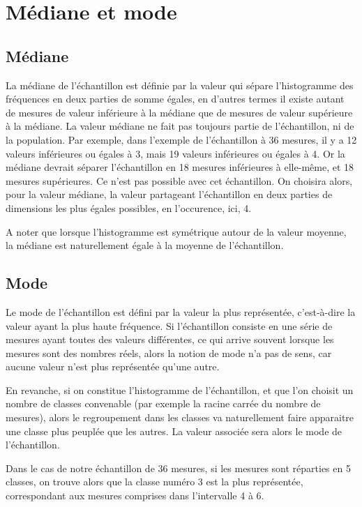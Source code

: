 \section{Médiane et mode}

\subsection{Médiane}

La médiane de l'échantillon est définie par la valeur qui sépare l'histogramme des fréquences en deux parties de somme égales, en d'autres termes il existe autant de mesures de valeur inférieure à la médiane que de mesures de valeur supérieure à la médiane. La valeur médiane ne fait pas toujours partie de l'échantillon, ni de la population. Par exemple, dans l'exemple de l'échantillon à 36 mesures, il y a 12 valeurs inférieures ou égales à 3, mais 19 valeurs inférieures ou égales à 4. Or la médiane devrait séparer l'échantillon en 18 mesures inférieures à elle-même, et 18 mesures supérieures. Ce n'est pas possible avec cet échantillon. On choisira alors, pour la valeur médiane, la valeur partageant l'échantillon en deux parties de dimensions les plus égales possibles, en l'occurence, ici, 4.

A noter que lorsque l'histogramme est symétrique autour de la valeur moyenne, la médiane est naturellement égale à la moyenne de l'échantillon.

\subsection{Mode}

Le mode de l'échantillon est défini par la valeur la plus représentée, c'est-à-dire la valeur ayant la plus haute fréquence. Si l'échantillon consiste en une série de mesures ayant toutes des valeurs différentes, ce qui arrive souvent lorsque les mesures sont des nombres réels, alors la notion de mode n'a pas de sens, car aucune valeur n'est plus représentée qu'une autre.

En revanche, si on constitue l'histogramme de l'échantillon, et que l'on choisit un nombre de classes convenable (par exemple la racine carrée du nombre de mesures), alors le regroupement dans les classes va naturellement faire apparaitre une classe plus peuplée que les autres. La valeur associée sera alors le mode de l'échantillon.

Dans le cas de notre échantillon de 36 mesures, si les mesures sont réparties en 5 classes, on trouve alors que la classe numéro 3 est la plus représentée, correspondant aux mesures comprises dans l'intervalle 4 à 6.

